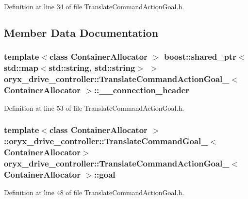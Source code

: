 \-Definition at line 34 of file \-Translate\-Command\-Action\-Goal.\-h.



\subsection{\-Member \-Data \-Documentation}
\subsubsection[{\-\_\-\-\_\-connection\-\_\-header}]{\setlength{\rightskip}{0pt plus 5cm}template$<$class Container\-Allocator $>$ boost\-::shared\-\_\-ptr$<$std\-::map$<$std\-::string, std\-::string$>$ $>$ {\bf oryx\-\_\-drive\-\_\-controller\-::\-Translate\-Command\-Action\-Goal\-\_\-}$<$ \-Container\-Allocator $>$\-::{\bf \-\_\-\-\_\-connection\-\_\-header}}\label{structoryx__drive__controller_1_1TranslateCommandActionGoal___acfca01b786b76a6d97e577e470b8419c}


\-Definition at line 53 of file \-Translate\-Command\-Action\-Goal.\-h.

\subsubsection[{goal}]{\setlength{\rightskip}{0pt plus 5cm}template$<$class Container\-Allocator $>$ \-::{\bf oryx\-\_\-drive\-\_\-controller\-::\-Translate\-Command\-Goal\-\_\-}$<$\-Container\-Allocator$>$ {\bf oryx\-\_\-drive\-\_\-controller\-::\-Translate\-Command\-Action\-Goal\-\_\-}$<$ \-Container\-Allocator $>$\-::{\bf goal}}\label{structoryx__drive__controller_1_1TranslateCommandActionGoal___ab174ba9809a03a849e13048a3db2ca78}


\-Definition at line 48 of file \-Translate\-Command\-Action\-Goal.\-h.

